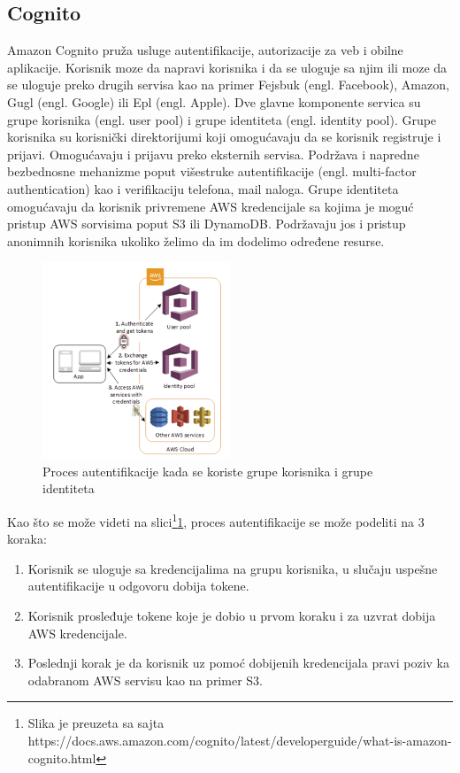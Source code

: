 \documentclass[12pt,oneside]{memoir}
\begin{document}
\subsection{Cognito}
 
Amazon Cognito pruža usluge autentifikacije, autorizacije za veb i obilne aplikacije. Korisnik moze da napravi korisnika i da se uloguje sa njim ili moze da se uloguje preko drugih servisa kao na primer Fejsbuk (engl. Facebook), Amazon, Gugl (engl. Google) ili Epl (engl. Apple). Dve glavne komponente servica su grupe korisnika (engl. user pool) i grupe identiteta (engl. identity pool). Grupe korisnika su korisnički direktorijumi koji omogućavaju da se korisnik registruje i prijavi. Omogućavaju i prijavu preko eksternih servisa. Podržava i napredne bezbednosne mehanizme poput višestruke autentifikacije (engl. multi-factor authentication) kao i verifikaciju telefona, mail naloga. Grupe identiteta omogućavaju da korisnik privremene AWS kredencijale sa kojima je moguć pristup AWS sorvisima poput S3 ili DynamoDB. Podržavaju jos i pristup anonimnih korisnika ukoliko želimo da im dodelimo određene resurse.


\begin{figure}[!ht]
  \centering
  \includegraphics[width=0.5\textwidth]{ProcesAutentifikacije.png}
  \caption{Proces autentifikacije kada se koriste grupe korisnika i grupe identiteta}
  \label{fig:procesAutentifikacije}
\end{figure}
 
Kao što se može videti na slici\footnote{Slika je preuzeta sa sajta https://docs.aws.amazon.com/cognito/latest/developerguide/what-is-amazon-cognito.html}\ref{fig:procesAutentifikacije}, proces autentifikacije se može podeliti na 3 koraka:
\begin{enumerate}
  \item Korisnik se uloguje sa kredencijalima na grupu korisnika, u slučaju uspešne autentifikacije u odgovoru dobija tokene.
  \item Korisnik prosleđuje tokene koje je dobio u prvom koraku i za uzvrat dobija AWS kredencijale.
  \item Poslednji korak je da korisnik uz pomoć dobijenih kredencijala pravi poziv ka odabranom AWS servisu kao na primer S3.
\end{enumerate}
\end{document}
